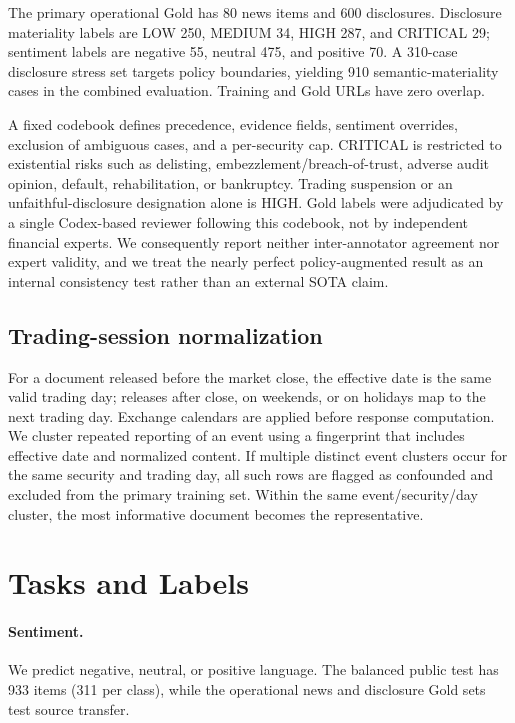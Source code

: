 \documentclass[11pt]{article}
\begin{document}
The primary operational Gold has 80 news items and 600 disclosures. Disclosure materiality labels are LOW 250, MEDIUM 34, HIGH 287, and CRITICAL 29; sentiment labels are negative 55, neutral 475, and positive 70. A 310-case disclosure stress set targets policy boundaries, yielding 910 semantic-materiality cases in the combined evaluation. Training and Gold URLs have zero overlap.

A fixed codebook defines precedence, evidence fields, sentiment overrides, exclusion of ambiguous cases, and a per-security cap. CRITICAL is restricted to existential risks such as delisting, embezzlement/breach-of-trust, adverse audit opinion, default, rehabilitation, or bankruptcy. Trading suspension or an unfaithful-disclosure designation alone is HIGH. Gold labels were adjudicated by a single Codex-based reviewer following this codebook, not by independent financial experts. We consequently report neither inter-annotator agreement nor expert validity, and we treat the nearly perfect policy-augmented result as an internal consistency test rather than an external SOTA claim.

\subsection{Trading-session normalization}

For a document released before the market close, the effective date is the same valid trading day; releases after close, on weekends, or on holidays map to the next trading day. Exchange calendars are applied before response computation. We cluster repeated reporting of an event using a fingerprint that includes effective date and normalized content. If multiple distinct event clusters occur for the same security and trading day, all such rows are flagged as confounded and excluded from the primary training set. Within the same event/security/day cluster, the most informative document becomes the representative.

\section{Tasks and Labels}

\paragraph{Sentiment.}
We predict negative, neutral, or positive language. The balanced public test has 933 items (311 per class), while the operational news and disclosure Gold sets test source transfer.
\end{document}

